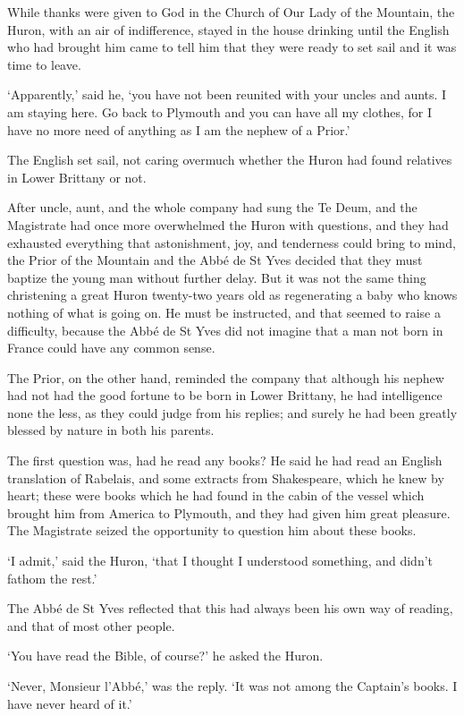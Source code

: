 \documentclass{article}
\begin{document}
\begin{center}
While thanks were given to God in the Church of Our Lady of the Mountain, the Huron, 
with an air of indifference, stayed in the house drinking until the English who 
had brought him came to tell him that they were ready to set sail and it was time 
to leave. 

`Apparently,' said he, `you have not been reunited with your uncles and aunts. 
I am staying here. Go back to Plymouth and you can have all my clothes, for I have 
no more need of anything as I am the nephew of a Prior.' 

The English set sail, not caring overmuch whether the Huron had found relatives 
in Lower Brittany or not. 

After uncle, aunt, and the whole company had sung the Te Deum, and the Magistrate 
had once more overwhelmed the Huron with questions, and they had exhausted everything 
that astonishment, joy, and tenderness could bring to mind, the Prior of the Mountain 
and the Abbé de St Yves decided that they must baptize the young man without further 
delay. But it was not the same thing christening a great Huron twenty-two years 
old as regenerating a baby who knows nothing of what is going on. He must be instructed, 
and that seemed to raise a difficulty, because the Abbé de St Yves did not imagine 
that a man not born in France could have any common sense. 

The Prior, on the other hand, reminded the company that although his nephew had 
not had the good fortune to be born in Lower Brittany, he had intelligence none 
the less, as they could judge from his replies; and surely he had been greatly 
blessed by nature in both his parents. 

The first question was, had he read any books? He said he had read an English translation 
of Rabelais, and some extracts from Shakespeare, which he knew by heart; these 
were books which he had found in the cabin of the vessel which brought him from 
America to Plymouth, and they had given him great pleasure. The Magistrate seized 
the opportunity to question him about these books. 

`I admit,' said the Huron, `that I thought I understood something, and didn't fathom 
the rest.' 

The Abbé de St Yves reflected that this had always been his own way of reading, 
and that of most other people. 

`You have read the Bible, of course?' he asked the Huron. 

`Never, Monsieur l'Abbé,' was the reply. `It was not among the Captain's books. 
I have never heard of it.' 


\end{center}
\end{document}
